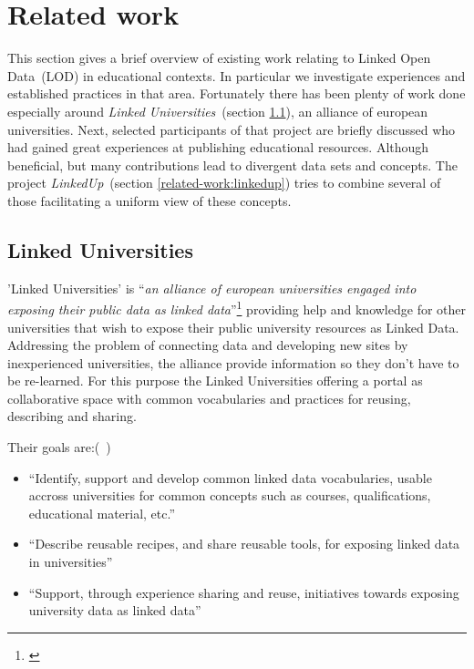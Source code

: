 \documentclass{article}
\begin{document}

\section{Related work}
\label{related-work}
This section gives a brief overview of existing work relating to Linked Open Data~(LOD) in educational contexts. In particular we investigate experiences and established practices in that area. Fortunately there has been plenty of work done especially around \textit{Linked Universities}~(section \ref{related-work:linked-universities}), an alliance of european universities. Next, selected participants of that project are briefly discussed who had gained great experiences at publishing educational resources. Although beneficial, but many contributions lead to divergent data sets and concepts. The project \textit{LinkedUp}~(section \ref{related-work:linkedup}) tries to combine several of those facilitating a uniform view of these concepts.

\subsection{Linked Universities}
\label{related-work:linked-universities}
'Linked Universities' is "`\textit{an alliance of european universities engaged into exposing their public data as linked data}"'\footnote{\cite{daquin_linked_2014}} providing help and knowledge for other universities that wish to expose their public university resources as Linked Data. Addressing the problem of connecting data and developing new sites by inexperienced universities, the alliance provide information so they don't have to be re-learned. For this purpose the Linked Universities offering a portal as collaborative space with common vocabularies and practices for reusing, describing and sharing. 

Their goals are:(~\cite{daquin_linked_2014})

\begin{itemize}
\item "`Identify, support and develop common linked data vocabularies, usable accross universities for common concepts such as courses, qualifications, educational material, etc."'
\item "`Describe reusable recipes, and share reusable tools, for exposing linked data in universities"'
\item "`Support, through experience sharing and reuse, initiatives towards exposing university data as linked data"'
\end{itemize}
\end{document}
